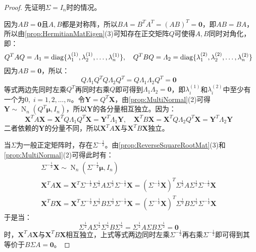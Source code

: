 \begin{proof}
	先证明$\Sigma=I_n$时的情况。\par
	因为$AB=\mathbf{0}$且$A,B$都是对称阵，所以$BA=B^TA^T=(AB)^T=\mathbf{0}$，即$AB=BA$，所以由\cref{prop:HermitianMatEigen}(3)可知存在正交矩阵$Q$可使得$A,B$同时对角化，即：
	\begin{equation*}
		Q^TAQ=\varLambda_1=\operatorname{diag}\{\lambda^{(1)}_1, \lambda^{(1)}_2, \dots, \lambda^{(1)}_{n}\},\quad Q^TBQ=\varLambda_2=\operatorname{diag}\{\lambda^{(2)}_1, \lambda^{(2)}_2, \dots, \lambda^{(2)}_{n}\}
	\end{equation*}
	因为$AB=\mathbf{0}$，所以：
	\begin{equation*}
		Q\varLambda_1Q^TQ\varLambda_2Q^T=Q\varLambda_1\varLambda_2Q^T=\mathbf{0}
	\end{equation*}
	等式两边先同时左乘$Q^T$再同时右乘$Q$即可得到$\varLambda_1\varLambda_2=\mathbf{0}$，即$\lambda_i^{(1)}$和$\lambda_i^{(2)}$中至少有一个为$0,\;i=1,2,\dots,n$。令$\mathbf{Y}=Q^T\mathbf{X}$，由\cref{prop:MultiNormal}(2)可得$\mathbf{Y}\sim\operatorname{N}_n(Q^T\boldsymbol{\mu},I_n)$，所以$\mathbf{Y}$的各分量相互独立。因为：
	\begin{equation*}
		\mathbf{X}^TA\mathbf{X}=\mathbf{X}^TQ\varLambda_1Q^T\mathbf{X}=\mathbf{Y}^T\varLambda_1\mathbf{Y},\quad\mathbf{X}^TB\mathbf{X}=\mathbf{X}^TQ\varLambda_2Q^T\mathbf{X}=\mathbf{Y}^T\varLambda_2\mathbf{Y}
	\end{equation*}
	二者依赖的$\mathbf{Y}$的分量不同，所以$\mathbf{X}^TA\mathbf{X}$与$\mathbf{X}^TB\mathbf{X}$独立。\par
	当$\Sigma$为一般正定矩阵时，存在$\Sigma^{-\frac{1}{2}}$。由\cref{prop:ReverseSquareRootMat}(3)和\cref{prop:MultiNormal}(2)可得此时有：
	\begin{gather*}
		\Sigma^{-\frac{1}{2}}\mathbf{X}\sim\operatorname{N}_n(\Sigma^{-\frac{1}{2}}\boldsymbol{\mu},I_n) \\
		\mathbf{X}^TA\mathbf{X}=\mathbf{X}^T\Sigma^{-\frac{1}{2}}\Sigma^{\frac{1}{2}}A\Sigma^{\frac{1}{2}}\Sigma^{-\frac{1}{2}}\mathbf{X}=(\Sigma^{-\frac{1}{2}}\mathbf{X})^T\Sigma^{\frac{1}{2}}A\Sigma^{\frac{1}{2}}\Sigma^{-\frac{1}{2}}\mathbf{X} \\
		\mathbf{X}^TB\mathbf{X}=\mathbf{X}^T\Sigma^{-\frac{1}{2}}\Sigma^{\frac{1}{2}}B\Sigma^{\frac{1}{2}}\Sigma^{-\frac{1}{2}}\mathbf{X}=(\Sigma^{-\frac{1}{2}}\mathbf{X})^T\Sigma^{\frac{1}{2}}B\Sigma^{\frac{1}{2}}\Sigma^{-\frac{1}{2}}\mathbf{X}
	\end{gather*}
	于是当：
	\begin{equation*}
		\Sigma^{\frac{1}{2}}A\Sigma^{\frac{1}{2}}\Sigma^{\frac{1}{2}}B\Sigma^{\frac{1}{2}}=\Sigma^{\frac{1}{2}}A\Sigma B\Sigma^{\frac{1}{2}}=\mathbf{0}
	\end{equation*}
	时，$\mathbf{X}^TA\mathbf{X}$与$\mathbf{X}^TB\mathbf{X}$相互独立，上式等式两边同时左乘$\Sigma^{-\frac{1}{2}}$再右乘$\Sigma^{-\frac{1}{2}}$即可得到其等价于$B\Sigma A=\mathbf{0}$。
\end{proof}

